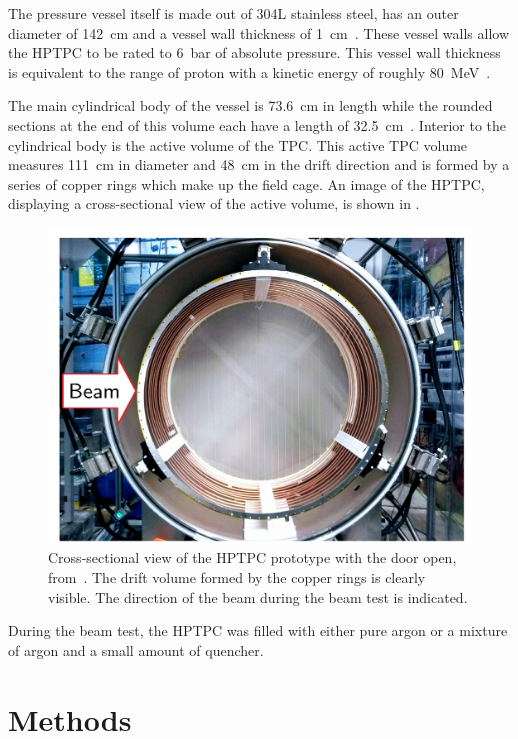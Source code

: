 The pressure vessel itself is made out of 304L stainless steel, has an outer diameter of \SI{142}{\centi\metre} and a vessel wall thickness of \SI{1}{\centi\metre}~\cite{deisting2021high}.
These vessel walls allow the HPTPC to be rated to 6~bar of absolute pressure.
This vessel wall thickness is equivalent to the range of proton with a kinetic energy of roughly \SI{80}{\mega\electronvolt}~\cite{protonRangeTables}.

The main cylindrical body of the vessel is \SI{73.6}{\centi\metre} in length while the rounded sections at the end of this volume each have a length of \SI{32.5}{\centi\metre}~\cite{deisting2021high}.
Interior to the cylindrical body is the active volume of the TPC.
This active TPC volume measures \SI{111}{\centi\metre} in diameter and \SI{48}{\centi\metre} in the drift direction and is formed by a series of copper rings which make up the field cage.
An image of the HPTPC, displaying a cross-sectional view of the active volume, is shown in .

\begin{figure}[h]
  \centering
  \includegraphics[width=.7\linewidth]{files/figures/hptpc_beam_flux/vesselView}
  \caption[Cross-sectional view of the HPTPC prototype]{Cross-sectional view of the HPTPC prototype with the door open, from~\cite{beampaper}. The drift volume formed by the copper rings is clearly visible. The direction of the beam during the beam test is indicated.}
  \label{fig:hptpc}
\end{figure}

During the beam test, the HPTPC was filled with either pure argon or a mixture of argon and a small amount of quencher.

\section{Methods}
\label{sec:hptpc_beam_flux:methods}

